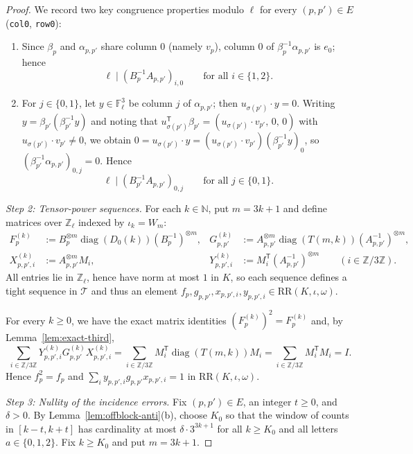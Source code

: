 \documentclass[11pt]{article}
\theoremstyle{definition}
\theoremstyle{remark}
\numberwithin{equation}{section}
\DeclareMathOperator{\diag}{diag}
\newcommand{\RR}{\mathrm{RR}}
\newcommand{\Z}{\mathbb{Z}}
\newcommand{\N}{\mathbb{N}}
\newcommand{\F}{\mathbb{F}}
\newcommand{\TT}{\mathcal{T}}
\newcommand{\1}{\mathbf{1}}
\newcommand{\code}[1]{{\normalfont\small\texttt{#1}}}
\begin{document}
\begin{proof}
We record two key congruence properties modulo $\ell$ for every $(p, p') \in E$ (\code{col0}, \code{row0}):
\begin{enumerate}[label=(\roman*),leftmargin=2.2em]
\item Since $\beta_p$ and $\alpha_{p,p'}$ share column $0$ (namely $v_p$), column $0$ of $\beta_p^{-1}\alpha_{p,p'}$ is $e_0$; hence
\[
\ell \mid (B_p^{-1} A_{p, p'})_{i, 0} \qquad\text{for all } i \in \{1, 2\}.
\]
\item For $j \in \{0, 1\}$, let $y \in \F_\ell^3$ be column $j$ of $\alpha_{p,p'}$; then $u_{\sigma(p')} \cdot y = 0$. Writing $y = \beta_{p'} (\beta_{p'}^{-1} y)$ and noting that $u_{\sigma(p')}^\mathsf{T} \beta_{p'} = (u_{\sigma(p')} \cdot v_{p'},\, 0,\, 0)$ with $u_{\sigma(p')} \cdot v_{p'} \neq 0$, we obtain $0 = u_{\sigma(p')} \cdot y = (u_{\sigma(p')} \cdot v_{p'})(\beta_{p'}^{-1} y)_0$, so $(\beta_{p'}^{-1} \alpha_{p,p'})_{0, j} = 0$. Hence
\[
\ell \mid (B_{p'}^{-1} A_{p, p'})_{0, j} \qquad\text{for all } j \in \{0, 1\}.
\]
\end{enumerate}

\emph{Step 2: Tensor-power sequences.}
For each $k \in \N$, put $m = 3k + 1$ and define matrices over $\Z_\ell$ indexed by $\iota_k = W_m$:
\begin{align*}
F_p^{(k)} &:= B_p^{\otimes m} \diag(D_0(k)) (B_p^{-1})^{\otimes m}, &
G_{p,p'}^{(k)} &:= A_{p,p'}^{\otimes m} \diag(T(m,k)) (A_{p,p'}^{-1})^{\otimes m}, \\
X_{p,p',i}^{(k)} &:= A_{p,p'}^{\otimes m} M_i, &
Y_{p,p',i}^{(k)} &:= M_i^\mathsf{T} (A_{p,p'}^{-1})^{\otimes m} \qquad (i \in \Z/3\Z).
\end{align*}
All entries lie in $\Z_\ell$, hence have norm at most $1$ in $K$, so each sequence defines a tight sequence in $\TT$ and thus an element $f_p, g_{p,p'}, x_{p,p',i}, y_{p,p',i} \in \RR(K, \iota, \omega)$.

For every $k \ge 0$, we have the exact matrix identities $(F_p^{(k)})^2 = F_p^{(k)}$ and, by Lemma~\ref{lem:exact-third},
\[
\sum_{i \in \Z/3\Z} Y_{p,p',i}^{(k)} G_{p,p'}^{(k)} X_{p,p',i}^{(k)}
= \sum_{i \in \Z/3\Z} M_i^\mathsf{T} \diag(T(m,k)) M_i
= \sum_{i \in \Z/3\Z} M_i^\mathsf{T} M_i = I.
\]
Hence $f_p^2 = f_p$ and $\sum_{i} y_{p,p',i} g_{p,p'} x_{p,p',i} = 1$ in $\RR(K, \iota, \omega)$.

\emph{Step 3: Nullity of the incidence errors.}
Fix $(p, p') \in E$, an integer $t \ge 0$, and $\delta > 0$. By Lemma~\ref{lem:offblock-anti}(b), choose $K_0$ so that the window of counts in $[k - t, k + t]$ has cardinality at most $\delta \cdot 3^{3k+1}$ for all $k \ge K_0$ and all letters $a \in \{0,1,2\}$. Fix $k \ge K_0$ and put $m = 3k + 1$.


\end{proof}
\end{document}
